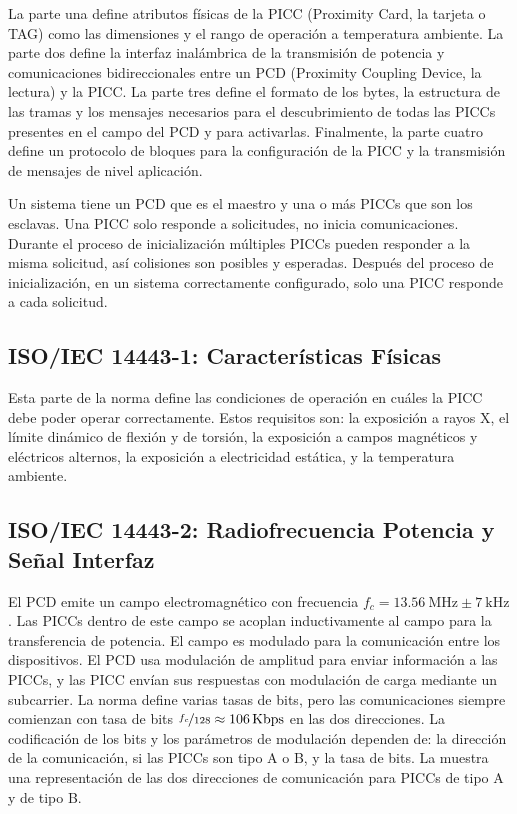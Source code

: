 \documentclass[a4paper, twoside, 11pt]{report}
\begin{document}
La parte una define atributos físicas de la PICC (Proximity Card, la tarjeta o TAG) como las dimensiones y el rango de operación a temperatura ambiente. La parte dos define la interfaz inalámbrica de la transmisión de potencia y comunicaciones bidireccionales entre un PCD (Proximity Coupling Device, la lectura) y la PICC. La parte tres define el formato de los bytes, la estructura de las tramas y los mensajes necesarios para el descubrimiento de todas las PICCs presentes en el campo del PCD y para activarlas. Finalmente, la parte cuatro define un protocolo de bloques para la configuración de la PICC y la transmisión de mensajes de nivel aplicación.

Un sistema tiene un PCD que es el maestro y una o más PICCs que son los esclavas. Una PICC solo responde a solicitudes, no inicia comunicaciones. Durante el proceso de inicialización múltiples PICCs pueden responder a la misma solicitud, así colisiones son posibles y esperadas. Después del proceso de inicialización, en un sistema correctamente configurado, solo una PICC responde a cada solicitud.

\FloatBarrier
\subsection{ISO/IEC 14443-1: \large{Características Físicas}}

Esta parte de la norma define las condiciones de operación en cuáles la PICC debe poder operar correctamente. Estos requisitos son: la exposición a rayos X, el límite dinámico de flexión y de torsión, la exposición a campos magnéticos y eléctricos alternos, la exposición a electricidad estática, y la temperatura ambiente\cite{iso14443-1}.

\FloatBarrier
\subsection{ISO/IEC 14443-2: \large{Radiofrecuencia Potencia y Señal Interfaz}}

El PCD emite un campo electromagnético con frecuencia $f_c = \SI{13.56}{\mega\hertz} \pm \SI{7}{\kilo\hertz}$. Las PICCs dentro de este campo se acoplan inductivamente al campo para la transferencia de potencia. El campo es modulado para la comunicación entre los dispositivos. El PCD usa modulación de amplitud para enviar información a las PICCs, y las PICC envían sus respuestas con modulación de carga mediante un subcarrier. La norma define varias tasas de bits, pero las comunicaciones siempre comienzan con tasa de bits $\nicefrac{f_c}{128} \approx \SI{106}{Kbps}$ en las dos direcciones. La codificación de los bits y los parámetros de modulación dependen de: la dirección de la comunicación, si las PICCs son tipo A o B, y la tasa de bits. La  muestra una representación de las dos direcciones de comunicación para PICCs de tipo A y de tipo B.
\end{document}
